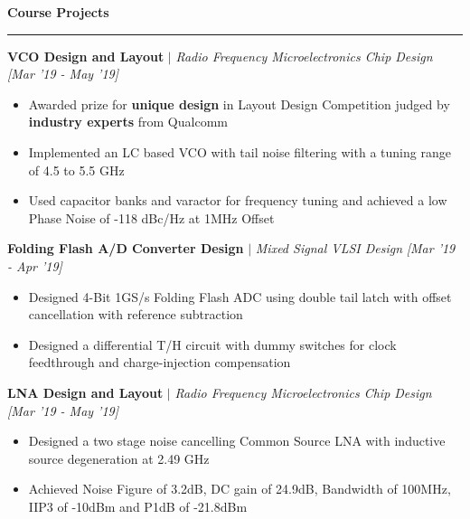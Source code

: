 \documentclass[11pt]{article}%
\begin{document}
\vspace{-4mm}


\begin{center}
\bf{\Large{Course Projects}}
\end{center}
\vspace{-1mm}
\hrule
{\flushleft \bf \large{VCO Design and Layout}} $\mid$ \textit{Radio Frequency Microelectronics Chip Design} \hfill {{{\em{[Mar '19 - May '19]}} }} \\
\begin{itemize}[leftmargin=*]
    \setlength\itemsep{0.001em}
    \vspace{-1.5mm}
    \item Awarded prize for \textbf{unique design} in Layout Design Competition judged by \textbf{industry experts} from Qualcomm 
    \item Implemented an LC based VCO with tail noise filtering with a tuning range of 4.5 to 5.5 GHz
    \item Used capacitor banks and varactor for frequency tuning and achieved a low Phase Noise of -118 dBc/Hz at 1MHz Offset
\end{itemize}

{\flushleft \bf \large{Folding Flash A/D Converter Design}} $\mid$ \textit{Mixed Signal VLSI Design} \hfill {{{\em{[Mar '19 - Apr '19]}} }} \\
\begin{itemize}[leftmargin=*]
    \setlength\itemsep{0.001em}
    \vspace{-1.5mm}
    \item Designed 4-Bit 1GS/s Folding Flash ADC using double tail latch with offset cancellation with reference subtraction
    \item Designed a differential T/H circuit with dummy switches for clock feedthrough and charge-injection compensation
\end{itemize}

{\flushleft \bf \large{LNA Design and Layout}} $\mid$ \textit{Radio Frequency Microelectronics Chip Design} \hfill {{{\em{[Mar '19 - May '19]}} }} \\
\begin{itemize}[leftmargin=*]
    \setlength\itemsep{0.001em}
    \vspace{-1.5mm}
    \item Designed a two stage noise cancelling Common Source LNA with inductive source degeneration at 2.49 GHz
    \item Achieved Noise Figure of 3.2dB, DC gain of 24.9dB, Bandwidth of 100MHz, IIP3 of -10dBm and P1dB of -21.8dBm
\end{itemize}
\end{document}
